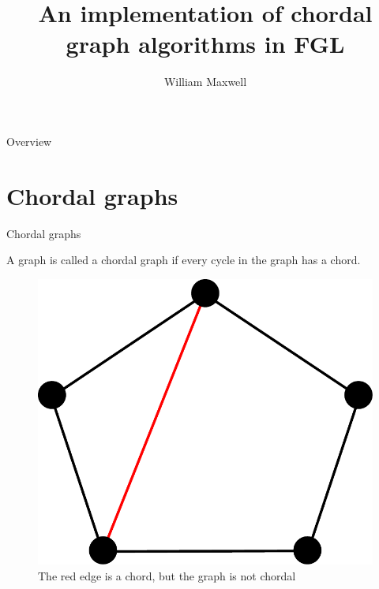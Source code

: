 \documentclass{beamer}
\author{William Maxwell}
\title{An implementation of chordal graph algorithms in FGL}
\date{}
\begin{document}
\begin{frame}
    \titlepage
\end{frame}

\begin{frame}{Overview}
    \tableofcontents
\end{frame}

\section{Chordal graphs}

\begin{frame}{Chordal graphs}
\begin{definition}
A graph is called a chordal graph if every cycle in the graph has a chord.
\end{definition}
\begin{figure}
        \includegraphics[scale=0.3]{chord.pdf}
        \caption*{The red edge is a chord, but the graph is not chordal}
\end{figure}
\end{frame}
\end{document}
